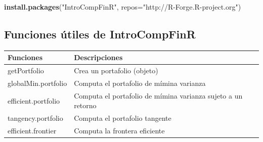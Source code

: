 \documentclass[12pt,]{book}
\newenvironment{Shaded}{\begin{snugshade}}{\end{snugshade}}
\newcommand{\KeywordTok}[1]{\textcolor[rgb]{0.13,0.29,0.53}{\textbf{#1}}}
\newcommand{\DataTypeTok}[1]{\textcolor[rgb]{0.13,0.29,0.53}{#1}}
\newcommand{\StringTok}[1]{\textcolor[rgb]{0.31,0.60,0.02}{#1}}
\newcommand{\NormalTok}[1]{#1}
\begin{document}
\begin{Shaded}
\begin{Highlighting}[]
\KeywordTok{install.packages}\NormalTok{(}\StringTok{"IntroCompFinR"}\NormalTok{, }\DataTypeTok{repos=}\StringTok{"http://R-Forge.R-project.org"}\NormalTok{)}
\end{Highlighting}
\end{Shaded}

\subsection{Funciones útiles de
IntroCompFinR}\label{funciones-utiles-de-introcompfinr}

\begin{longtable}[]{@{}ll@{}}
\toprule
\begin{minipage}[b]{0.24\columnwidth}\raggedright\strut
Funciones\strut
\end{minipage} & \begin{minipage}[b]{0.70\columnwidth}\raggedright\strut
Descripciones\strut
\end{minipage}\tabularnewline
\midrule
\endhead
\begin{minipage}[t]{0.24\columnwidth}\raggedright\strut
getPortfolio\strut
\end{minipage} & \begin{minipage}[t]{0.70\columnwidth}\raggedright\strut
Crea un portafolio (objeto)\strut
\end{minipage}\tabularnewline
\begin{minipage}[t]{0.24\columnwidth}\raggedright\strut
globalMin.portfolio\strut
\end{minipage} & \begin{minipage}[t]{0.70\columnwidth}\raggedright\strut
Computa el portafolio de mímina varianza\strut
\end{minipage}\tabularnewline
\begin{minipage}[t]{0.24\columnwidth}\raggedright\strut
efficient.portfolio\strut
\end{minipage} & \begin{minipage}[t]{0.70\columnwidth}\raggedright\strut
Computa el portafolio de mímina varianza sujeto a un retorno\strut
\end{minipage}\tabularnewline
\begin{minipage}[t]{0.24\columnwidth}\raggedright\strut
tangency.portfolio\strut
\end{minipage} & \begin{minipage}[t]{0.70\columnwidth}\raggedright\strut
Computa el portafolio tangente\strut
\end{minipage}\tabularnewline
\begin{minipage}[t]{0.24\columnwidth}\raggedright\strut
efficient.frontier\strut
\end{minipage} & \begin{minipage}[t]{0.70\columnwidth}\raggedright\strut
Computa la frontera eficiente\strut
\end{minipage}\tabularnewline
\bottomrule
\end{longtable}
\end{document}
